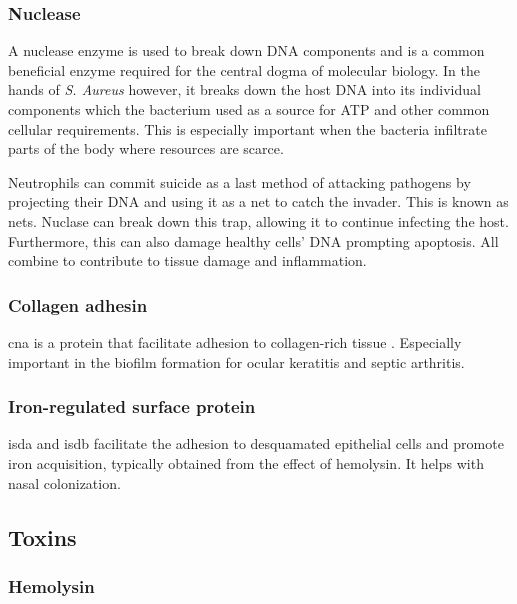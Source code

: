 \subsubsection{Nuclease}

\label{staphNuclease}

A nuclease enzyme is used to break down DNA components and is a common beneficial enzyme required for the central dogma of molecular biology. In the hands of \textit{S. Aureus} however, it breaks down the host DNA into its individual components which the bacterium used as a source for ATP and other common cellular requirements. This is especially important when the bacteria infiltrate parts of the body where resources are scarce.

Neutrophils can commit suicide as a last method of attacking pathogens by projecting their DNA and using it as a net to catch the invader. This is known as \gls{nets}. Nuclase can break down this trap, allowing it to continue infecting the host. Furthermore, this can also damage healthy cells' DNA prompting apoptosis. All combine to contribute to tissue damage and inflammation.

\subsubsection{Collagen adhesin}

\gls{cna} is a protein that facilitate adhesion to collagen-rich tissue \cite{Patti1994} \cite{MURUGAN2010}. Especially important in the biofilm formation for ocular keratitis and septic arthritis.

\subsubsection{Iron-regulated surface protein}

\gls{isda} and \gls{isdb} facilitate the adhesion to desquamated epithelial cells and promote iron acquisition, typically obtained from the effect of hemolysin. It helps with nasal colonization. \cite{Foster2013} \cite{Cheng2009}

\subsection{Toxins}

\subsubsection{Hemolysin}

